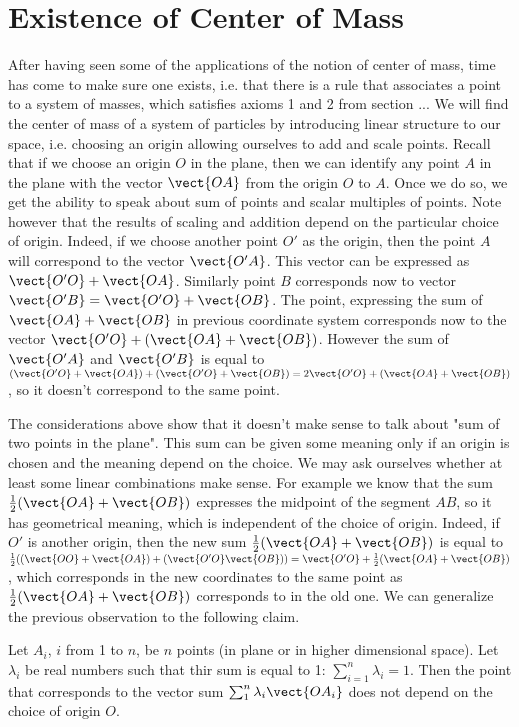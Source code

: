 \section{Existence of Center of Mass}
After having seen some of the applications of the notion of center of mass, time has come to make sure one exists, i.e. that there is a rule that associates a point to a system of masses, which satisfies axioms 1 and 2 from section ...
We will find the center of mass of a system of particles by introducing linear structure to our space, i.e. choosing an origin allowing ourselves to add and scale points.
Recall that if we choose an origin $O$ in the plane, then we can identify any point $A$ in the plane with the vector $\vect{OA}$ from the origin $O$ to $A$. Once we do so, we get the ability to speak about sum of points and scalar multiples of points. Note however that the results of scaling and addition depend on the particular choice of origin. Indeed, if we choose another point $O'$ as the origin, then the point $A$ will correspond to the vector $\vect{O'A}$. This vector can be expressed as $\vect{O'O}+\vect{OA}$. Similarly point $B$ corresponds now to vector $\vect{O'B}=\vect{O'O}+\vect{OB}$. The point, expressing the sum of $\vect{OA}+\vect{OB}$ in previous coordinate system corresponds now to the vector $\vect{O'O}+(\vect{OA}+\vect{OB})$. However the sum of $\vect{O'A}$ and $\vect{O'B}$ is equal to $(\vect{O'O}+\vect{OA})+(\vect{O'O}+\vect{OB})=2\vect{O'O}+(\vect{OA}+\vect{OB})$, so it doesn't correspond to the same point.

The considerations above show that it doesn't make sense to talk about "sum of two points in the plane". This sum can be given some meaning only if an origin is chosen and the meaning depend on the choice. We may ask ourselves whether at least some linear combinations make sense. For example we know that the sum $\frac{1}{2}(\vect{OA}+\vect{OB})$ expresses the midpoint of the segment $AB$, so it has geometrical meaning, which is independent of the choice of origin.
Indeed, if $O'$ is another origin, then the new sum $\frac{1}{2}(\vect{OA}+\vect{OB})$ is equal to $\frac{1}{2}((\vect{O
O}+\vect{OA})+(\vect{O'O}\vect{OB}))=\vect{O'O}+\frac{1}{2}(\vect{OA}+\vect{OB})$, which corresponds in the new coordinates to the same point as $\frac{1}{2}(\vect{OA}+\vect{OB})$ corresponds to in the old one.
We can generalize the previous observation to the following claim.
\begin{claim}
Let $A_i$, $i$ from 1 to $n$, be $n$ points (in plane or in higher dimensional space). Let $\lambda_i$ be real numbers such that thir sum is equal to 1: $\sum_{i=1}^{n}{\lambda_i}=1$. Then the point that corresponds to the vector sum $\sum_1^n{\lambda_i\vect{OA_i}}$ does not depend on the choice of origin $O$.
\end{claim}
